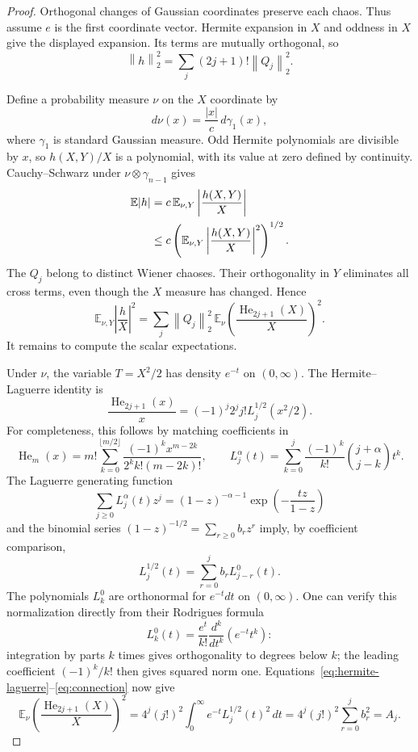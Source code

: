 \documentclass[11pt]{article}
\newcommand{\E}{\mathbb E}
\newcommand{\He}{\operatorname{He}}
\newcommand{\norm}[1]{\left\lVert #1\right\rVert}
\begin{document}
\begin{proof}
Orthogonal changes of Gaussian coordinates preserve each chaos.  Thus assume
$e$ is the first coordinate vector.  Hermite expansion in $X$ and oddness in
$X$ give the displayed expansion.  Its terms are mutually orthogonal, so
\begin{equation}\label{eq:variance}
 \norm{h}_2^2=\sum_j(2j+1)!\norm{Q_j}_2^2.
\end{equation}

Define a probability measure $\nu$ on the $X$ coordinate by
\[
 d\nu(x)=\frac{|x|}{c}\,d\gamma_1(x),
\]
where $\gamma_1$ is standard Gaussian measure.  Odd Hermite polynomials are
divisible by $x$, so $h(X,Y)/X$ is a polynomial, with its value at zero defined
by continuity.  Cauchy--Schwarz under $\nu\otimes\gamma_{n-1}$ gives
\begin{align}
 \E|h|
 &=c\,\E_{\nu,Y}\left|\frac{h(X,Y)}{X}\right| \notag\\
 &\leq c\left(\E_{\nu,Y}
             \left|\frac{h(X,Y)}{X}\right|^2\right)^{1/2}.\label{eq:bias}
\end{align}
The $Q_j$ belong to distinct Wiener chaoses.  Their orthogonality in $Y$
eliminates all cross terms, even though the $X$ measure has changed.  Hence
\begin{equation}\label{eq:cross}
 \E_{\nu,Y}\left|\frac{h}{X}\right|^2
 =\sum_j\norm{Q_j}_2^2\,
   \E_\nu\left(\frac{\He_{2j+1}(X)}{X}\right)^2.
\end{equation}
It remains to compute the scalar expectations.

Under $\nu$, the variable $T=X^2/2$ has density $e^{-t}$ on $(0,\infty)$.
The Hermite--Laguerre identity is
\begin{equation}\label{eq:hermite-laguerre}
 \frac{\He_{2j+1}(x)}{x}
 =(-1)^j2^j j!L_j^{1/2}(x^2/2).
\end{equation}
For completeness, this follows by matching coefficients in
\[
 \He_m(x)=m!\sum_{k=0}^{\lfloor m/2\rfloor}
   \frac{(-1)^k x^{m-2k}}{2^k k!(m-2k)!},
 \qquad
 L_j^{\alpha}(t)=\sum_{k=0}^j
   \frac{(-1)^k}{k!}\binom{j+\alpha}{j-k}t^k.
\]
The Laguerre generating function
\[
 \sum_{j\geq0}L_j^{\alpha}(t)z^j
 =(1-z)^{-\alpha-1}\exp\left(-\frac{tz}{1-z}\right)
\]
and the binomial series $(1-z)^{-1/2}=\sum_{r\geq0}b_rz^r$ imply, by
coefficient comparison,
\begin{equation}\label{eq:connection}
 L_j^{1/2}(t)=\sum_{r=0}^j b_rL_{j-r}^{0}(t).
\end{equation}
The polynomials $L_k^0$ are orthonormal for $e^{-t}dt$ on $(0,\infty)$.
One can verify this normalization directly from their Rodrigues formula
\[
 L_k^0(t)=\frac{e^t}{k!}\frac{d^k}{dt^k}(e^{-t}t^k):
\]
integration by parts $k$ times gives orthogonality to degrees below $k$;
the leading coefficient $(-1)^k/k!$ then gives squared norm one.
Equations~\eqref{eq:hermite-laguerre}--\eqref{eq:connection} now give
\[
 \E_\nu\left(\frac{\He_{2j+1}(X)}{X}\right)^2
 =4^j(j!)^2\int_0^\infty e^{-t}L_j^{1/2}(t)^2\,dt
 =4^j(j!)^2\sum_{r=0}^j b_r^2=A_j.
\]


\end{proof}
\end{document}
